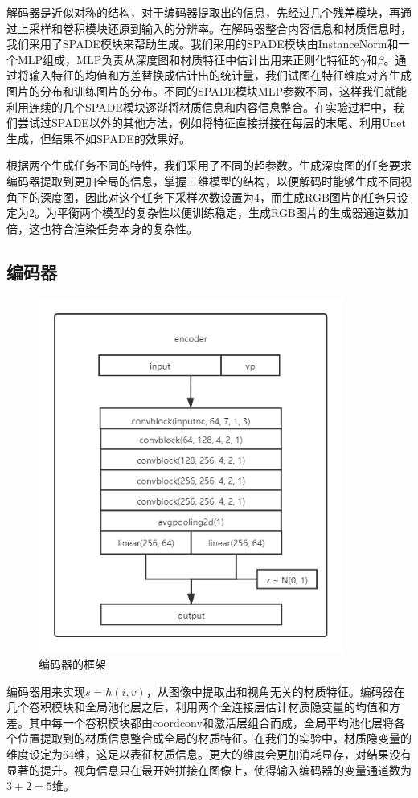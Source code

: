\documentclass[UTF8,openany,AutoFakeBold,AutoFakeSlant,cs4size]{ctexbook}
\begin{document}
解码器是近似对称的结构，对于编码器提取出的信息，先经过几个残差模块，再通过上采样和卷积模块还原到输入的分辨率。在解码器整合内容信息和材质信息时，我们采用了SPADE模块来帮助生成。我们采用的SPADE模块由InstanceNorm和一个MLP组成，MLP负责从深度图和材质特征中估计出用来正则化特征的$\gamma$和$\beta$。通过将输入特征的均值和方差替换成估计出的统计量，我们试图在特征维度对齐生成图片的分布和训练图片的分布。不同的SPADE模块MLP参数不同，这样我们就能利用连续的几个SPADE模块逐渐将材质信息和内容信息整合。在实验过程中，我们尝试过SPADE以外的其他方法，例如将特征直接拼接在每层的末尾、利用Unet生成，但结果不如SPADE的效果好。

根据两个生成任务不同的特性，我们采用了不同的超参数。生成深度图的任务要求编码器提取到更加全局的信息，掌握三维模型的结构，以便解码时能够生成不同视角下的深度图，因此对这个任务下采样次数设置为4，而生成RGB图片的任务只设定为2。为平衡两个模型的复杂性以便训练稳定，生成RGB图片的生成器通道数加倍，这也符合渲染任务本身的复杂性。


\subsection{编码器}

\begin{figure}
\centering
\includegraphics[width=10cm]{./images/encoder.png}
\caption{编码器的框架}
\label{fig:sample}
\end{figure}

编码器用来实现$s = h(i, v)$，从图像中提取出和视角无关的材质特征。编码器在几个卷积模块和全局池化层之后，利用两个全连接层估计材质隐变量的均值和方差。其中每一个卷积模块都由coordconv和激活层组合而成，全局平均池化层将各个位置提取到的材质信息整合成全局的材质特征。在我们的实验中，材质隐变量的维度设定为64维，这足以表征材质信息。更大的维度会更加消耗显存，对结果没有显著的提升。视角信息只在最开始拼接在图像上，使得输入编码器的变量通道数为$3 + 2 = 5$维。
\end{document}
